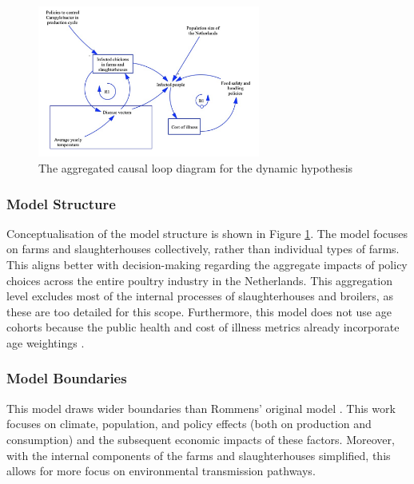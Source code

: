 \begin{figure}[h]
\centering
\includegraphics[width=0.65\textwidth]{images/dynamic_hypo2.png}
\caption{The aggregated causal loop diagram for the dynamic hypothesis}
\label{fig:aggregrated_cld}
\end{figure}
 
\subsubsection*{Model Structure}
Conceptualisation of the model structure is shown in Figure \ref{fig:aggregrated_cld}. The model focuses on farms and slaughterhouses collectively, rather than individual types of farms. This aligns better with decision-making regarding the aggregate impacts of policy choices across the entire poultry industry in the Netherlands. This aggregation level excludes most of the internal processes of slaughterhouses and broilers, as these are too detailed for this scope. Furthermore, this model does not use age cohorts because the public health and cost of illness metrics already incorporate age weightings \parencite{mangen_campylobacteriosis_2007}.  %
\subsubsection*{Model Boundaries}

This model draws wider boundaries than Rommens' original model \parencite{rommens_infected_2020}. This work focuses on climate, population, and policy effects (both on production and consumption) and the subsequent economic impacts of these factors. Moreover, with the internal components of the farms and slaughterhouses simplified, this allows for more focus on environmental transmission pathways. 


